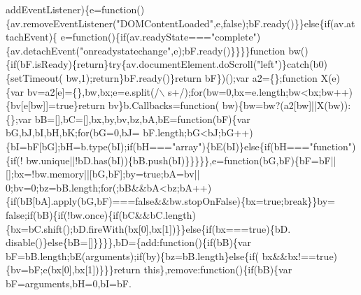 \begin{DoxyCode}
      addEventListener)\{e=\textcolor{keyword}{function}()\{av.removeEventListener(\textcolor{stringliteral}{"DOMContentLoaded"},e,\textcolor{keyword}{false});bF.ready()\}\}\textcolor{keywordflow}{else}\{\textcolor{keywordflow}{if}(av.attachEvent)\{
      e=\textcolor{keyword}{function}()\{\textcolor{keywordflow}{if}(av.readyState===\textcolor{stringliteral}{"complete"})\{av.detachEvent(\textcolor{stringliteral}{"onreadystatechange"},e);bF.ready()\}\}\}\}\textcolor{keyword}{function} 
      bw()\{\textcolor{keywordflow}{if}(bF.isReady)\{\textcolor{keywordflow}{return}\}\textcolor{keywordflow}{try}\{av.documentElement.doScroll(\textcolor{stringliteral}{"left"})\}\textcolor{keywordflow}{catch}(b0)\{setTimeout(
      bw,1);\textcolor{keywordflow}{return}\}bF.ready()\}\textcolor{keywordflow}{return} bF\})();var a2=\{\};\textcolor{keyword}{function} X(e)\{var bv=a2[e]=\{\},bw,bx;e=e.split(/\(\backslash\)
      s+/);\textcolor{keywordflow}{for}(bw=0,bx=e.length;bw<bx;bw++)\{bv[e[bw]]=\textcolor{keyword}{true}\}\textcolor{keywordflow}{return} bv\}b.Callbacks=\textcolor{keyword}{function}(
      bw)\{bw=bw?(a2[bw]||X(bw)):\{\};var bB=[],bC=[],bx,by,bv,bz,bA,bE=\textcolor{keyword}{function}(bF)\{var bG,bJ,bI,bH,bK;\textcolor{keywordflow}{for}(bG=0,bJ=
      bF.length;bG<bJ;bG++)\{bI=bF[bG];bH=b.type(bI);\textcolor{keywordflow}{if}(bH===\textcolor{stringliteral}{"array"})\{bE(bI)\}\textcolor{keywordflow}{else}\{\textcolor{keywordflow}{if}(bH===\textcolor{stringliteral}{"function"})\{\textcolor{keywordflow}{if}(!
      bw.unique||!bD.has(bI))\{bB.push(bI)\}\}\}\}\},e=\textcolor{keyword}{function}(bG,bF)\{bF=bF||[];bx=!bw.memory||[bG,bF];by=\textcolor{keyword}{true};bA=bv||
      0;bv=0;bz=bB.length;\textcolor{keywordflow}{for}(;bB&&bA<bz;bA++)\{\textcolor{keywordflow}{if}(bB[bA].apply(bG,bF)===\textcolor{keyword}{false}&&bw.stopOnFalse)\{bx=\textcolor{keyword}{true};\textcolor{keywordflow}{break}\}\}by=\textcolor{keyword}{
      false};\textcolor{keywordflow}{if}(bB)\{\textcolor{keywordflow}{if}(!bw.once)\{\textcolor{keywordflow}{if}(bC&&bC.length)\{bx=bC.shift();bD.fireWith(bx[0],bx[1])\}\}\textcolor{keywordflow}{else}\{\textcolor{keywordflow}{if}(bx===\textcolor{keyword}{true})\{bD.
      disable()\}\textcolor{keywordflow}{else}\{bB=[]\}\}\}\},bD=\{add:\textcolor{keyword}{function}()\{\textcolor{keywordflow}{if}(bB)\{var bF=bB.length;bE(arguments);\textcolor{keywordflow}{if}(by)\{bz=bB.length\}\textcolor{keywordflow}{else}\{\textcolor{keywordflow}{if}(
      bx&&bx!==\textcolor{keyword}{true})\{bv=bF;e(bx[0],bx[1])\}\}\}\textcolor{keywordflow}{return} \textcolor{keyword}{this}\},\textcolor{keyword}{remove}:\textcolor{keyword}{function}()\{\textcolor{keywordflow}{if}(bB)\{var bF=arguments,bH=0,bI=bF.

\end{DoxyCode}
